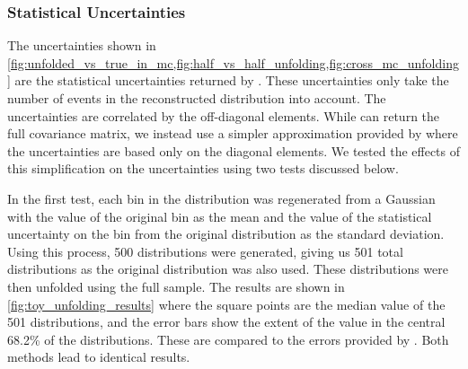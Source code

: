 \subsubsection{Statistical Uncertainties}
\label{ssec:unfolding_statistical_uncertainties}

The uncertainties shown in
\cref{fig:unfolded_vs_true_in_mc,fig:half_vs_half_unfolding,fig:cross_mc_unfolding}
are the statistical uncertainties returned by \RooUnfold. These uncertainties
only take the number of events in the reconstructed distribution into account.
The uncertainties are correlated by the off-diagonal elements. While \RooUnfold
can return the full covariance matrix, we instead use a simpler approximation
provided by \RooUnfold where the uncertainties are based only on the diagonal
elements. We tested the effects of this simplification on the uncertainties
using two tests discussed below.

In the first test, each bin in the \POWHEG \phistar distribution was
regenerated from a Gaussian with the value of the original bin as the mean and
the value of the statistical uncertainty on the bin from the original
distribution as the standard deviation. Using this process, \num{500} \phistar
distributions were generated, giving us \num{501} total distributions as the
original distribution was also used. These distributions were then unfolded
using the full \MADGRAPH sample. The results are shown in
\cref{fig:toy_unfolding_results} where the square points are the median
value of the 501 distributions, and the error bars show the extent of the value
in the central 68.2\% of the distributions. These are compared to the errors
provided by \RooUnfold. Both methods lead to identical results.

